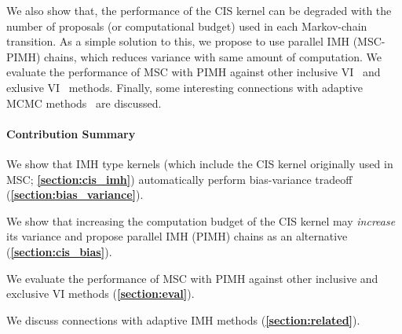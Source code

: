 We also show that, the performance of the CIS kernel can be degraded with the number of proposals (or computational budget) used in each Markov-chain transition.
As a simple solution to this, we propose to use parallel IMH (MSC-PIMH) chains, which reduces variance with same amount of computation.
We evaluate the performance of MSC with PIMH against other inclusive VI~\citep{DBLP:journals/corr/BornscheinB14, NEURIPS2020_b2070693} and exlusive VI~\citep{pmlr-v33-ranganath14, JMLR:v18:16-107} methods.
Finally, some interesting connections with adaptive MCMC methods~\citep{10.1007/s11222-008-9110-y} are discussed.

\paragraph{Contribution Summary}
\begin{enumerate*}[label=\textbf{(\roman*)}]
\item We show that IMH type kernels (which include the CIS kernel originally used in MSC; \textbf{\cref{section:cis_imh}}) automatically perform bias-variance tradeoff (\textbf{\cref{section:bias_variance}}).
\item We show that increasing the computation budget of the CIS kernel may \textit{increase} its variance and propose parallel IMH (PIMH) chains as an alternative (\textbf{\cref{section:cis_bias}}).
\item We evaluate the performance of MSC with PIMH against other inclusive and exclusive VI methods (\textbf{\cref{section:eval}}).
\item We discuss connections with adaptive IMH methods (\textbf{\cref{section:related}}).
\end{enumerate*}


